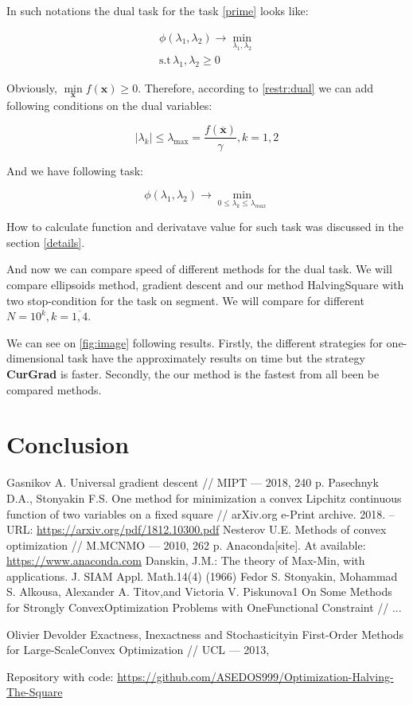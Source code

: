 \documentclass[12pt]{article}
\begin{document}
In such notations the dual task for the task \ref{prime} looks like:

\begin{gather}
\phi(\lambda_1, \lambda_2) \rightarrow \min\limits_{\lambda_1, \lambda_2}\\
\text{s.t}\, \lambda_1, \lambda_2 \geq 0
\end{gather}
 
Obviously, $\min\limits_{\textbf{x}}f(\textbf{x}) \geq 0$. Therefore, according to \ref{restr:dual} we can add following conditions on the dual variables:

$$|\lambda_k| \leq \lambda_{\text{max}}=\frac{f(\overline{\textbf{x}})}{\gamma}, k=1,2$$

And we have following task:

$$\phi(\lambda_1, \lambda_2) \rightarrow \min_{0\leq\lambda_k\leq\lambda_{max}}$$

How to calculate function and derivatave value for such task was discussed in the section \ref{details}.

And now we can compare speed of different methods for the dual task. We will compare ellipsoids method, gradient descent and our method HalvingSquare with two stop-condition for the task on segment. We will compare for different $N = 10^k, k = \overline{1, 4}$.

We can see on \ref{fig:image} following results. Firstly, the different strategies for one-dimensional task have the approximately results on time but the strategy \textbf{CurGrad} is faster. Secondly, the our method is the fastest from all been be compared methods.

\section{Conclusion}
\newpage
\begin{thebibliography}{3}
Gasnikov A.  Universal gradient descent // MIPT --- 2018, 240 p.
Pasechnyk D.A., Stonyakin F.S.  One method for minimization a convex Lipchitz continuous function of two variables on a fixed square // arXiv.org e-Print archive. 2018. – URL: \href{https://arxiv.org/pdf/1812.10300.pdf}{https://arxiv.org/pdf/1812.10300.pdf}
Nesterov U.E.  Methods of convex optimization // M.MCNMO --- 2010, 262 p.
Anaconda[site]. At available: \href{https://www.anaconda.com}{https://www.anaconda.com}
Danskin, J.M.: The theory of Max-Min, with applications. J. SIAM Appl. Math.14(4) (1966)
Fedor S. Stonyakin, Mohammad S. Alkousa, Alexander A. Titov,and Victoria V. Piskunova1 On Some Methods for Strongly ConvexOptimization Problems with OneFunctional Constraint // ...

Olivier Devolder Exactness, Inexactness and Stochasticityin First-Order Methods for Large-ScaleConvex Optimization // UCL --- 2013,

Repository with code: \href{https://github.com/ASEDOS999/Optimization-Halving-The-Square}{https://github.com/ASEDOS999/Optimization-Halving-The-Square}
\end{thebibliography}
\end{document}
